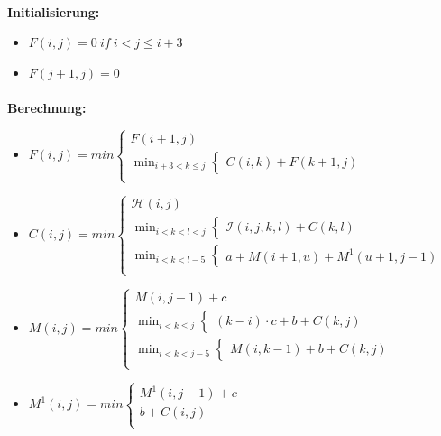 \paragraph{}
\textbf{Initialisierung:}
\begin{itemize}
	\item[] $F(i,j)=0\ if \ i<j\le i+3$ 
	\item[] $F(j+1, j) = 0$
\end{itemize}
\paragraph{}
\textbf{Berechnung:}
\begin{itemize}
	\item[]$F(i,j)=min
			\begin{cases}
               F(i+1, j)\\
               \displaystyle\min_{i+3 < k \le j} \begin{cases} C(i,k) + F(k+1, j) \end{cases}\\
			\end{cases}$

	\item[] $C(i,j) = min
		\begin{cases}
			\mathcal{H}(i,j)\\
			\displaystyle\min_{i < k < l < j} \begin{cases} \mathcal{I}(i,j,k,l) + C(k,l) \end{cases}\\
			\displaystyle\min_{i < k < l-5} \begin{cases} a + M(i+1, u) + M^1(u+1, j-1) \end{cases}\\
		\end{cases}$
	\item[] $M(i,j) = min
		\begin{cases}
			M(i,j-1) + c\\
			\displaystyle\min_{i < k \le j} \begin{cases} (k-i) \cdot c + b + C(k,j)\end{cases}\\
			\displaystyle\min_{i < k < j-5} \begin{cases} M(i, k-1) + b + C(k,j)\end{cases}\\
		\end{cases}$
	\item[]$M^1(i,j) = min
		\begin{cases}
			M^1(i,j-1) + c\\
			b + C(i,j)\\
		\end{cases}$
\end{itemize}
